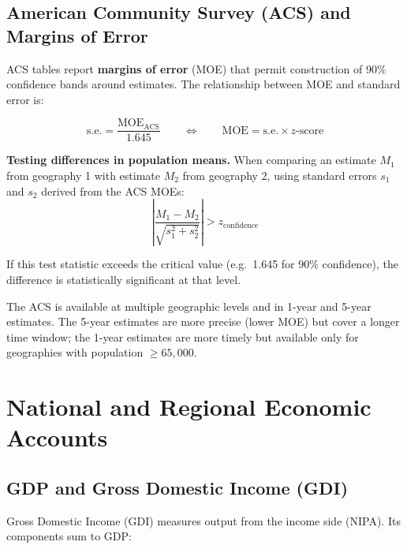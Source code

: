 \subsection{American Community Survey (ACS) and Margins of Error}

ACS tables report \textbf{margins of error} (MOE) that permit construction
of 90\% confidence bands around estimates. The relationship between MOE
and standard error is:

\begin{tcolorbox}[keyresult]
\begin{equation}
  \text{s.e.} = \frac{\text{MOE}_\text{ACS}}{1.645}
  \qquad\Longleftrightarrow\qquad
  \text{MOE} = \text{s.e.} \times z\text{-score}
\end{equation}
\end{tcolorbox}

\noindent\textbf{Testing differences in population means.} When comparing
an estimate $M_1$ from geography 1 with estimate $M_2$ from geography 2,
using standard errors $s_1$ and $s_2$ derived from the ACS MOEs:
\begin{equation}
  \left|\frac{M_1 - M_2}{\sqrt{s_1^2 + s_2^2}}\right| > z_\text{confidence}
\end{equation}

If this test statistic exceeds the critical value (e.g.\ 1.645 for 90\%
confidence), the difference is statistically significant at that level.

The ACS is available at multiple geographic levels and in 1-year and 5-year
estimates. The 5-year estimates are more precise (lower MOE) but cover a
longer time window; the 1-year estimates are more timely but available only
for geographies with population $\geq 65{,}000$.


\section{National and Regional Economic Accounts}
\label{sec_NationalAccounts}

\subsection{GDP and Gross Domestic Income (GDI)}

Gross Domestic Income (GDI) measures output from the income side
(NIPA). Its
components sum to GDP:

